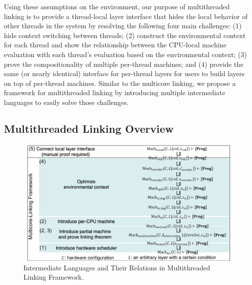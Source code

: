 Using these assumptions on the environment, our purpose of multithreaded linking is to provide a thread-local layer interface that hides the local behavior of other threads in the system by resolving the following four main challenges: 
(1) hide context switching between threads; 
(2) construct the environmental context for each thread and show the relationship between the CPU-local machine evaluation with each thread’s evaluation based on the environmental context; 
(3) prove the compositionality of multiple per-thread machines; and 
(4) provide the same (or nearly identical) interface for per-thread layers for users to build layers on top of per-thread machines. 
Similar to the multicore linking, we propose a framework for multithreaded linking by introducing multiple intermediate languages to easily solve those challenges.




\subsection{Multithreaded Linking Overview}
\label{chapter:linking:subsec:multithreaded-linking-overview}



\begin{figure}
\begin{center}
\includegraphics[width=\textwidth, page=2]{figs/conlink/concurrent_linking}
\caption{Intermediate Languages and Their Relations  in Multithreaded Linking Framework.}
\label{fig:chapter:linking:multithreaded-linking-structure}
\end{center}
\end{figure}

